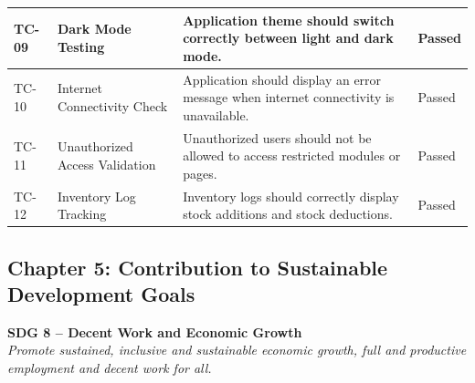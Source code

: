 \documentclass[12pt, oneside]{article}
\begin{document}
\begin{longtable}{|p{2cm}|p{4cm}|p{6cm}|p{2cm}|}
\hline
TC-09 & Dark Mode Testing & Application theme should switch correctly between light and dark mode. & Passed \\
\hline
TC-10 & Internet Connectivity Check & Application should display an error message when internet connectivity is unavailable. & Passed \\
\hline
TC-11 & Unauthorized Access Validation & Unauthorized users should not be allowed to access restricted modules or pages. & Passed \\
\hline
TC-12 & Inventory Log Tracking & Inventory logs should correctly display stock additions and stock deductions. & Passed \\
\hline
\end{longtable}


\newpage
\begin{center}
    \section*{Chapter 5: Contribution to Sustainable Development Goals}
\end{center}

\vspace{0.8em}

\textbf{SDG 8 – Decent Work and Economic Growth} \\
\textit{Promote sustained, inclusive and sustainable economic growth, full and productive employment and decent work for all.}
\end{document}
